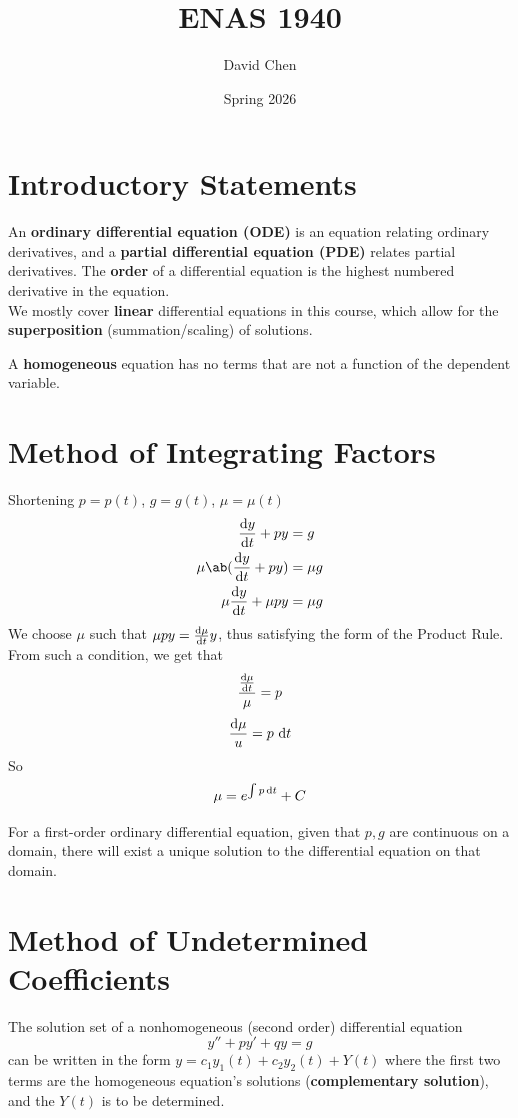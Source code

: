 \documentclass{article}
\title{ENAS 1940}
\author{David Chen}
\date{Spring 2026}
\begin{document}
\maketitle

\section{Introductory Statements}
An \textbf{ordinary differential equation (ODE)} is an equation relating ordinary derivatives, and a \textbf{partial differential equation (PDE)} relates partial derivatives.
The \textbf{order} of a differential equation is the highest numbered derivative in the equation.\\
We mostly cover \textbf{linear} differential equations in this course, which allow for the \textbf{superposition} (summation/scaling) of solutions. 

A \textbf{homogeneous} equation has no terms that are not a function of the dependent variable.

\section{Method of Integrating Factors}
Shortening $p = p(t)$, $g=g(t)$, $\mu = \mu(t)$
\begin{align*}
    \odv{y}{t} + py &= g\\
    \mu\ab(\odv{y}{t} + py) &= \mu g\\
    \mu\odv{y}{t} + \mu py &= \mu g
\end{align*}
We choose $\mu$ such that $\mu p y = \odv{\mu}{t}y$, thus satisfying the form of the Product Rule. From such a condition, we get that
$$\frac{\odv{\mu}{t}}{\mu} = p$$
$$\frac{\odif{\mu}}{u} = p\,\odif{t}$$
So $$\mu=e^{\int p\odif{t}} + C$$

For a first-order ordinary differential equation, given that $p,g$ are continuous on a domain, there will exist a unique solution to the differential equation on that domain.

\section{Method of Undetermined Coefficients}
The solution set of a nonhomogeneous (second order) differential equation
$$y''+py'+qy=g$$
can be written in the form
$y=c_1y_1(t)+c_2y_2(t)+Y(t)$
where the first two terms are the homogeneous equation's solutions (\textbf{complementary solution}), and the $Y(t)$ is to be determined.
\end{document}

